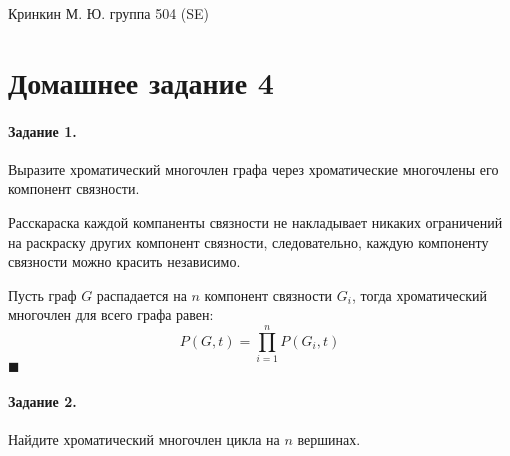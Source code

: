 \documentclass[a4paper,12pt]{article}
\begin{document}
\lstset{
	basicstyle=\small,
	stringstyle=\ttfamily,
	showstringspaces=false,
	columns=fixed,
	breaklines=true,
	numbers=right,
	numberstyle=\tiny
}

\newtheorem{Def}{Определение}[section]
\newtheorem{Th}{Теорема}
\newtheorem{Lem}[Th]{Лемма}
\newenvironment{Proof}
	{\par\noindent{\bf Доказательство.}}
	{\hfill$\scriptstyle\blacksquare$}
\newenvironment{Solution}
	{\par\noindent{\bf Решение.}}
	{\hfill$\scriptstyle\blacksquare$}

\begin{flushright}
	Кринкин М. Ю. группа 504 (SE)
\end{flushright}

\section{Домашнее задание 4}

\paragraph{Задание 1.} Выразите хроматический многочлен графа через хроматические многочлены его компонент связности.

\begin{Solution}
Расскараска каждой компаненты связности не накладывает никаких ограничений на раскраску других компонент связности, следовательно, каждую компоненту связности можно красить независимо.

Пусть граф $G$ распадается на $n$ компонент связности $G_i$, тогда хроматический многочлен для всего графа равен:
\[
	P\left(G,t\right) = \prod_{i=1}^{n} P\left(G_i,t\right)
\]
\end{Solution}

\paragraph{Задание 2.} Найдите хроматический многочлен цикла на $n$ вершинах.
\end{document}
